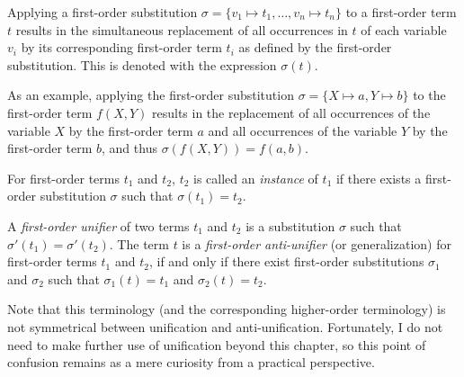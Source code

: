 \begin{defn}\label{def:apply_substitution}
Applying a first-order substitution $\sigma = \{v_1 \mapsto t_1, \ldots, v_n \mapsto t_n\}$ to a first-order term $t$ results in the simultaneous replacement of all occurrences in $t$ of each variable $v_i$ by its corresponding first-order term $t_i$ as defined by the first-order substitution. This is denoted with the expression $\sigma(t)$.
\end{defn}

As an example, applying the first-order substitution $\sigma = \{X \mapsto a, Y \mapsto b\}$
to the first-order term $f(X,Y)$ results in the replacement of all occurrences of the variable $X$ by the first-order term $a$ and all occurrences of the variable $Y$ by the first-order term $b$, and thus $\sigma(f(X,Y)) = f(a,b)$.

\begin{defn}\label{def:instance}
For first-order terms $t_1$ and $t_2$, $t_2$ is called an \emph{instance} of $t_1$ if there exists a first-order substitution $\sigma$ such that $\sigma(t_1) = t_2$.
\end{defn}



\begin{defn}\label{def:generalization}
A \emph{first-order unifier} of two terms $t_1$ and $t_2$ is a substitution $\sigma$ such that $\sigma'(t_1)=\sigma'(t_2)$.  The term $t$ is a \emph{first-order anti-unifier} (or generalization) for first-order terms $t_1$ and $t_2$, if and only if there exist first-order substitutions $\sigma_1$ and $\sigma_2$ such that $\sigma_1(t)=t_1$ and $\sigma_2(t)=t_2$. 
\end{defn}

Note that this terminology (and the corresponding higher-order terminology) is not symmetrical between unification and anti-unification.  Fortunately, I do not need to make further use of unification beyond this chapter, so this point of confusion remains as a mere curiosity from a practical perspective.

